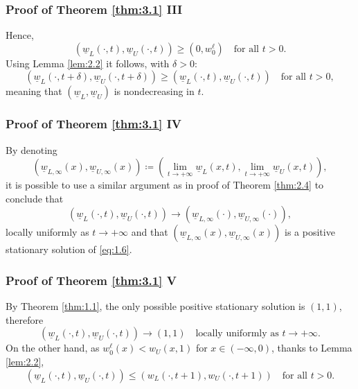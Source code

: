 
\begin{frame}
    \frametitle{Proof of Theorem \ref{thm:3.1} III}
    \begin{proofc}
        Hence,
        \begin{equation*}
            (\underline{w}_L(\cdot, t), \underline{w}_U(\cdot, t)) \geq (0, w_0^\ell) \quad \text{for all } t > 0.
        \end{equation*}
        Using Lemma \ref{lem:2.2} it follows, with \(\delta > 0\):
        \begin{equation*}
            (\underline{w}_L(\cdot, t + \delta), \underline{w}_U(\cdot, t + \delta)) \geq (\underline{w}_L(\cdot, t), \underline{w}_U(\cdot, t)) \quad \text{for all } t > 0,
        \end{equation*}
        meaning that \((\underline{w}_L, \underline{w}_U)\) is nondecreasing in \(t\). 
    \end{proofc}
\end{frame}


\begin{frame}
    \frametitle{Proof of Theorem \ref{thm:3.1} IV}
    \begin{proofc}
        By denoting 
        \[
            \left(\underline{w}_{L, \infty}(x), \underline{w}_{U, \infty}(x)\right) \coloneqq \left(\lim_{t \to +\infty} \underline{w}_L(x, t), \lim_{t \to +\infty} \underline{w}_U(x, t)\right), 
        \]
        it is possible to use a similar argument as in proof of Theorem \ref{thm:2.4} to conclude that
        \[
            (\underline{w}_{L}(\cdot, t), \underline{w}_{U}(\cdot, t)) \to (\underline{w}_{L, \infty}(\cdot), \underline{w}_{U, \infty}(\cdot)),
        \]
        locally uniformly as \(t \to +\infty\) and that \((\underline{w}_{L, \infty}(x), \underline{w}_{U, \infty}(x))\) is a positive stationary solution of \eqref{eq:1.6}. 
    \end{proofc}
\end{frame}


\begin{frame}
    \frametitle{Proof of Theorem \ref{thm:3.1} V}
    \begin{proofc}
        By Theorem \ref{thm:1.1}, the only possible positive stationary solution is \((1, 1)\), therefore
        \begin{equation}
            (\underline{w}_{L}(\cdot, t), \underline{w}_{U}(\cdot, t)) \to (1, 1) \quad \text{locally uniformly as } t \to +\infty.
            \label{eq:3.4}
        \end{equation}
        On the other hand, as \(w_0^\ell(x) < w_U(x, 1)\) for \(x \in (-\infty, 0)\), thanks to Lemma \ref{lem:2.2},
    \[
        (\underline{w}_L(\cdot, t), \underline{w}_U(\cdot, t)) \leq ({w}_L(\cdot, t + 1), {w}_U(\cdot, t + 1)) \quad \text{for all } t > 0.
    \]
    \end{proofc}
\end{frame}

